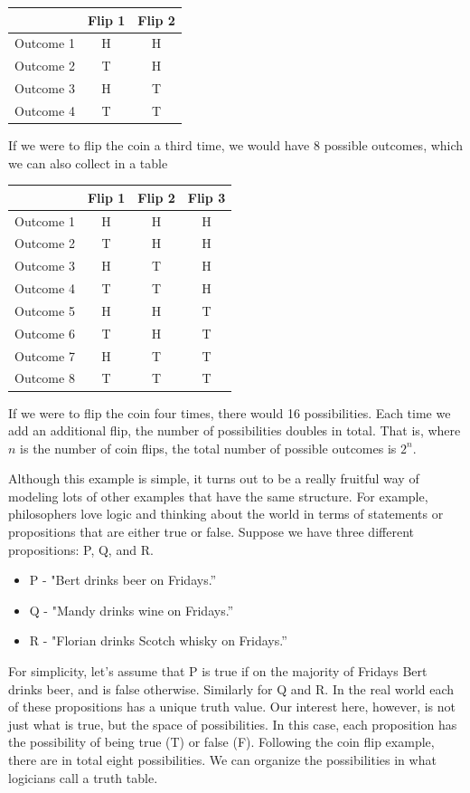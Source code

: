 \documentclass[]{tufte-book}
\providecommand{\tightlist}{%
  \setlength{\itemsep}{0pt}\setlength{\parskip}{0pt}}
\begin{document}
\begin{longtable}[]{@{}lcc@{}}
\toprule
& Flip 1 & Flip 2\tabularnewline
\midrule
\endhead
Outcome 1 & H & H\tabularnewline
Outcome 2 & T & H\tabularnewline
Outcome 3 & H & T\tabularnewline
Outcome 4 & T & T\tabularnewline
\bottomrule
\end{longtable}

If we were to flip the coin a third time, we would have 8 possible outcomes, which we can also collect in a table

\begin{longtable}[]{@{}lccc@{}}
\toprule
& Flip 1 & Flip 2 & Flip 3\tabularnewline
\midrule
\endhead
Outcome 1 & H & H & H\tabularnewline
Outcome 2 & T & H & H\tabularnewline
Outcome 3 & H & T & H\tabularnewline
Outcome 4 & T & T & H\tabularnewline
Outcome 5 & H & H & T\tabularnewline
Outcome 6 & T & H & T\tabularnewline
Outcome 7 & H & T & T\tabularnewline
Outcome 8 & T & T & T\tabularnewline
\bottomrule
\end{longtable}

If we were to flip the coin four times, there would 16 possibilities. Each time we add an additional flip, the number of possibilities doubles in total. That is, where \(n\) is the number of coin flips, the total number of possible outcomes is \(2^n\).

Although this example is simple, it turns out to be a really fruitful way of modeling lots of other examples that have the same structure. For example, philosophers love logic and thinking about the world in terms of statements or propositions that are either true or false. Suppose we have three different propositions: P, Q, and R.

\begin{itemize}
\tightlist
\item
  P - "Bert drinks beer on Fridays.''
\item
  Q - "Mandy drinks wine on Fridays.''
\item
  R - "Florian drinks Scotch whisky on Fridays.''
\end{itemize}

For simplicity, let's assume that P is true if on the majority of Fridays Bert drinks beer, and is false otherwise. Similarly for Q and R. In the real world each of these propositions has a unique truth value. Our interest here, however, is not just what is true, but the space of possibilities. In this case, each proposition has the possibility of being true (T) or false (F). Following the coin flip example, there are in total eight possibilities. We can organize the possibilities in what logicians call a truth table.
\end{document}
